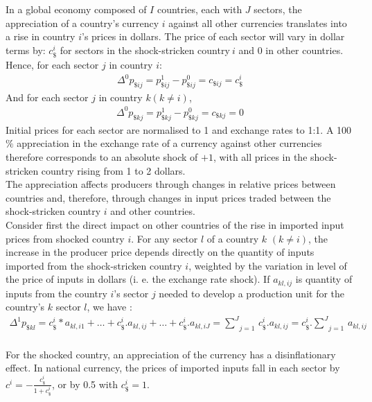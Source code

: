 \documentclass[11pt,a4paper]{article}
\begin{document}
In a global economy composed of $I$ countries, each with $J$ sectors, the appreciation of a country's currency $i$ against all other currencies translates into a rise in country $i$'s prices in dollars. The price of each sector will vary in dollar terms by: $c_\$^i$ for sectors in the shock-stricken country$~i$ and 0 in other countries. \\
Hence, for each sector $j$ in country $i$:
\begin{eqnarray*}
 {{\Delta }^{0}}p_{\${ij}}=p_{\${ij}}^{1}-p_{\${ij}}^{0}=c_{\${ij}}=c_{\$}^i
  \end{eqnarray*}	
And for each sector $j$ in country $k (k\ne i)$,
\begin{eqnarray*}
 {{\Delta }^{0}}p_{\${kj}}=p_{\${kj}}^{1}-p_{\${kj}}^{0}=c_{\${kj}}=0
 \end{eqnarray*}	
Initial prices for each sector are normalised to 1 and exchange rates to 1:1. 
A 100$\%$ appreciation in the exchange rate of a currency against other currencies therefore corresponds to an absolute shock of $+1$, with all prices in the shock-stricken country rising from 1 to 2 dollars.\\
The appreciation affects producers through changes in relative prices between countries and, therefore, through changes in input prices traded between the shock-stricken country $i$ and other countries. \\
Consider first the direct impact on other countries of the rise in imported input prices from shocked country $i$. For any sector $l$ of a country $k$ $(k\ne i)$, the increase in the producer price depends directly on the quantity of inputs imported from the shock-stricken country $i$, weighted by the variation in level of the price of inputs in dollars (i. e. the exchange rate shock). If $a_{kl,ij}$ is quantity of inputs from the country $i$'s sector $j$ needed to develop a production unit for the country's $k$ sector $l$, we have :\\
\begin{eqnarray}
\Delta ^1 p_{\${kl}}=c_\$^i*a_{kl,i1}+\ldots+c_\$^i.a_{kl,ij}+\ldots+c_\$^i.a_{kl,iJ}=\underset{j=1}{\overset{J}{\mathop\sum}}\,c_\$^i.a_{kl,ij}=c_\$^i.\underset{j=1}{\overset{J}{\mathop\sum}}\,a_{kl,ij}  
\label{eq:eq1} 
\end{eqnarray}
\\
For the shocked country, an appreciation of the currency has a disinflationary effect. In national currency, the prices of imported inputs fall in each sector by $c^i=-\frac{c_\$^i}{1+{c_\$^i}}$, or by 0.5 with $c_\$^i=1$. \\
\end{document}
